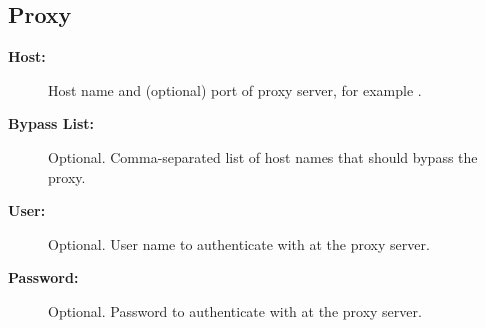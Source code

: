 \documentclass[letterpaper,10pt,english]{manual}
\begin{document}
\subsection{Proxy}
\begin{description}
\item[\textbf{Host:}]
Host name and (optional) port of proxy server, for
example .

\item[\textbf{Bypass List:}]
Optional. Comma-separated list of host names that
should bypass the proxy.

\item[\textbf{User:}]
Optional. User name to authenticate with at the
proxy server.

\item[\textbf{Password:}]
Optional. Password to authenticate with at the
proxy server.

\end{description}
\hypertarget{module-email.settings}{}
\end{document}
